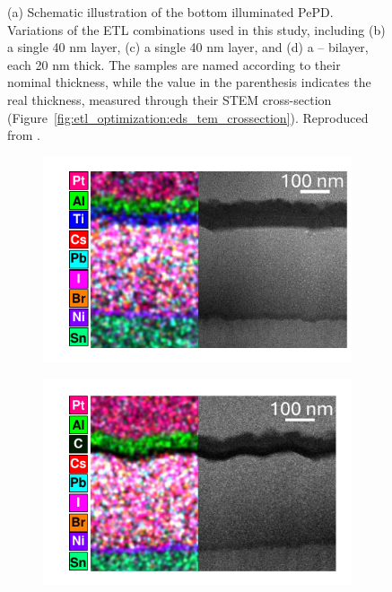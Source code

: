 \begin{figure}[htbp]
    \caption[Schematic illustration of ETL combinations used in this study.]{(a) Schematic illustration of the bottom illuminated PePD. Variations of the ETL combinations used in this study, including (b) a single 40 nm  layer, (c) a single 40 nm  layer, and (d) a  –  bilayer, each 20 nm thick. The samples are named according to their nominal thickness, while the value in the parenthesis indicates the real thickness, measured through their STEM cross-section (Figure~\ref{fig:etl_optimization:eds_tem_crossection}). Reproduced from \cite{Papadopoulou2025ElectronSpeed}.}
    \label{fig:etl_optimization:stacks}
\end{figure}

\begin{figure}[ht!]
    \centering
    \begin{subfigure}[t]{0.45\textwidth}
        \centering
        \includegraphics[width=\textwidth]{chapters/transport_layers/images/EDS_TEM_TiO2.pdf} %
        \caption{}
        \label{}
    \end{subfigure}
    \hspace{0.5cm}
    \begin{subfigure}[t]{0.45\textwidth}
        \centering
        \includegraphics[width=\textwidth]{chapters/transport_layers/images/EDS_TEM_C60.pdf} 

\end{subfigure}
\end{figure}
